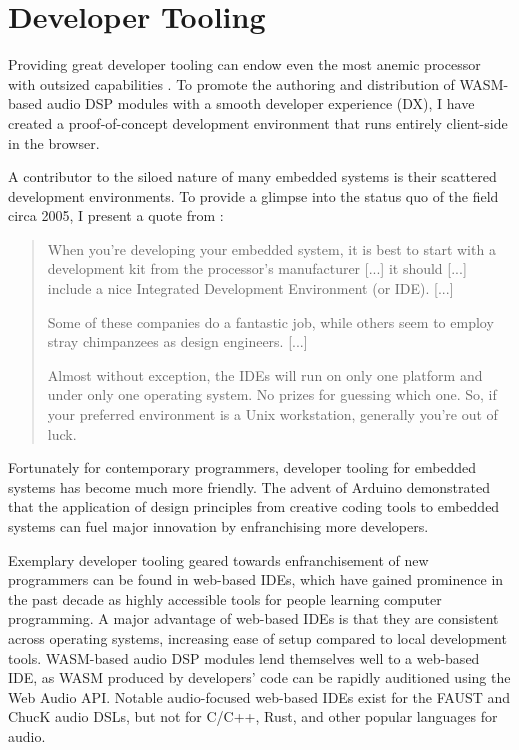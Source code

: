 \chapter { Developer Tooling }

Providing great developer tooling can endow even the most anemic processor with outsized capabilities \cite{nytimes_doom_ports_2025}\cite{evans_wasm_microcontrollers}. To promote the authoring and distribution of WASM-based audio DSP modules with a smooth developer experience (DX), I have created a proof-of-concept development environment that runs entirely client-side in the browser.

A contributor to the siloed nature of many embedded systems is their scattered development environments. To provide a glimpse into the status quo of the field circa 2005, I present a quote from \cite{catsoulis2005designing}:

\begin{quotation}
When you're developing your embedded system, it is best to start with a
development kit from the processor's manufacturer [...] it should [...]
include a nice Integrated Development Environment (or IDE). [...]

Some of these companies do a fantastic job, while others seem to employ
stray chimpanzees as design engineers. [...]

Almost without exception, the IDEs will run on only one platform and
under only one operating system. No prizes for guessing which one.
So, if your preferred environment is a Unix workstation, generally
you're out of luck.
\end{quotation}

Fortunately for contemporary programmers, developer tooling for embedded systems has become much more friendly. The advent of Arduino\cite{arduino} demonstrated that the application of design principles from creative coding tools to embedded systems can fuel major innovation by enfranchising more developers.

Exemplary developer tooling geared towards enfranchisement of new programmers can be found in web-based IDEs, which have gained prominence in the past decade as highly accessible tools for people learning computer programming\cite{6654478}\cite{delgadillo2025fully}. A major advantage of web-based IDEs is that they are consistent across operating systems, increasing ease of setup compared to local development tools. WASM-based audio DSP modules lend themselves well to a web-based IDE, as WASM produced by developers' code can be rapidly auditioned using the Web Audio API. Notable audio-focused web-based IDEs exist for the FAUST\cite{ren2019faust} and ChucK\cite{mulshine2023webchuck} audio DSLs, but not for C/C++, Rust, and other popular languages for audio.

